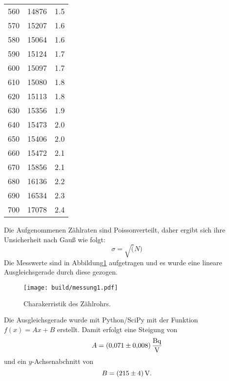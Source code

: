 \begin{table}
\begin{tabular}{S[table-format=3.0] S[table-format=5.0] S[table-format=1.2(0)e0]}
        560 & 14876 & 1.5 \\
        570 & 15207 & 1.6 \\
        580 & 15064 & 1.6 \\
        590 & 15124 & 1.7 \\
        600 & 15097 & 1.7 \\
        610 & 15080 & 1.8 \\
        620 & 15113 & 1.8 \\
        630 & 15356 & 1.9 \\
        640 & 15473 & 2.0 \\
        650 & 15406 & 2.0 \\
        660 & 15472 & 2.1 \\
        670 & 15856 & 2.1 \\
        680 & 16136 & 2.2 \\
        690 & 16534 & 2.3 \\
        700 & 17078 & 2.4 \\
        \bottomrule
    \end{tabular}
\end{table}
\noindent Die Aufgenommenen Zählraten sind Poissonverteilt, daher ergibt sich ihre Unsicherheit nach Gauß wie folgt:
\begin{equation}
  \sigma = \sqrt(N)
\end{equation}
Die Messwerte sind in Abbildung\ref{fig:plot} aufgetragen und es wurde eine lineare Ausgleichsgerade durch diese gezogen.
\begin{figure}[H]
  \centering
  \texttt{[image: build/messung1.pdf]}
  \caption{Charakerristik des Zählrohrs.}
  \label{fig:plot}
\end{figure}
\noindent  Die Ausgleichsgerade wurde mit Python/SciPy mit der Funktion $f(x)= Ax + B$ erstellt.
Damit erfolgt eine Steigung von
\begin{equation}
  A = \SI{0.071 \pm 0.008}{\becquerel\per\volt}
\end{equation}
und ein $y$-Achsenabchnitt von
\begin{equation}
  B =   \SI[per-mode=reciprocal]{215\pm 4}{\volt}        .
\end{equation}

